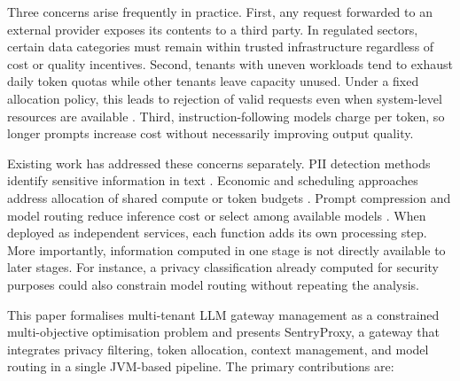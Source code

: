 \documentclass[conference]{IEEEtran}
\begin{document}
Three concerns arise frequently in practice. First, any request forwarded to an external provider exposes its contents to a third party. In regulated sectors, certain data categories must remain within trusted infrastructure regardless of cost or quality incentives. Second, tenants with uneven workloads tend to exhaust daily token quotas while other tenants leave capacity unused. Under a fixed allocation policy, this leads to rejection of valid requests even when system-level resources are available \cite{b_fairserve}. Third, instruction-following models charge per token, so longer prompts increase cost without necessarily improving output quality.

Existing work has addressed these concerns separately. PII detection methods identify sensitive information in text \cite{b_spacy,b_llmguard}. Economic and scheduling approaches address allocation of shared compute or token budgets \cite{b_stackelberg,b_vcg}. Prompt compression and model routing reduce inference cost or select among available models \cite{b_llmlingua,b_frugalgpt,b_routerbench}. When deployed as independent services, each function adds its own processing step. More importantly, information computed in one stage is not directly available to later stages. For instance, a privacy classification already computed for security purposes could also constrain model routing without repeating the analysis.

This paper formalises multi-tenant LLM gateway management as a constrained multi-objective optimisation problem and presents SentryProxy, a gateway that integrates privacy filtering, token allocation, context management, and model routing in a single JVM-based pipeline. The primary contributions are:
\end{document}
